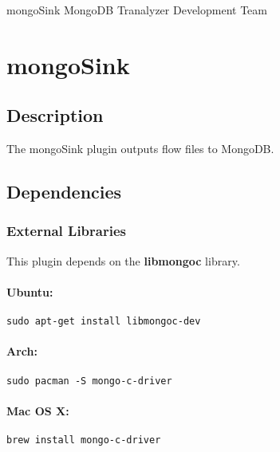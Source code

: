 \documentclass[documentation]{subfiles}
\begin{document}
\trantitle
    {mongoSink} %
    {MongoDB} %
    {Tranalyzer Development Team} %

\section{mongoSink}\label{s:mongoSink}

\subsection{Description}
The mongoSink plugin outputs flow files to MongoDB.

\subsection{Dependencies}

\subsubsection{External Libraries}
This plugin depends on the {\bf libmongoc} library.
\paragraph{Ubuntu:} {\tt sudo apt-get install libmongoc-dev}
\paragraph{Arch:} {\tt sudo pacman -S mongo-c-driver}
\paragraph{Mac OS X:} {\tt brew install mongo-c-driver}
\end{document}
